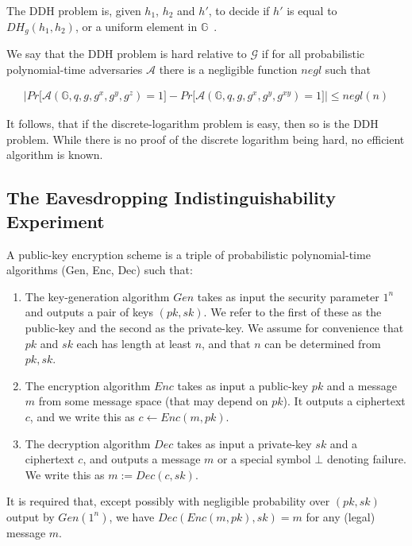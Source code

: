 The DDH problem is, given $h_1$, $h_2$ and $h'$, to decide if $h'$ is equal to $DH_g(h_1, h_2)$, or a uniform element in $\mathbb{G}$~\cite[page 321]{katz2014introduction}.
\begin{definition}
We say that the DDH problem is hard relative to $\mathcal{G}$ if for all probabilistic polynomial-time adversaries $\mathcal{A}$ there is a negligible function $negl$ such that
\vspace{-1em}
\begin{addmargin}[-0.5em]{-0.5em} 
{\setlength{\mathindent}{0cm}
\begin{align*}
\Big\lvert Pr\big[\mathcal{A}\left(\mathbb{G}, q, g, g^x, g^y, g^z \right) = 1\big] - Pr\big[ \mathcal{A}\left(\mathbb{G}, q, g, g^x, g^y, g^{xy}\right) =1  \big] \Big\rvert \leq negl(n)
\end{align*}}
\end{addmargin} 
\end{definition}

It follows, that if the discrete-logarithm problem is easy, then so is the DDH problem. While there is no proof of the discrete logarithm being hard, no efficient algorithm is known. %

\subsection{The Eavesdropping Indistinguishability Experiment}

\begin{definition}
A public-key encryption scheme is a triple of probabilistic polynomial-time algorithms (Gen, Enc, Dec) such that:
\begin{enumerate}

    \item The key-generation algorithm $Gen$ takes as input the security parameter $1^n$ and outputs a pair of keys $(pk,sk)$. We refer to the first of these as the public-key and the second as the private-key. We assume for convenience that $pk$ and $sk$ each has length at least $n$, and that $n$ can be determined from $pk,sk$.
    
    \item The encryption algorithm $Enc$ takes as input a public-key $pk$ and a message $m$ from some message space (that may depend on $pk$). It outputs a ciphertext $c$, and we write this as $c \leftarrow Enc(m,pk)$.
    
    \item The decryption algorithm $Dec$ takes as input a private-key $sk$ and a ciphertext $c$, and outputs a message $m$ or a special symbol $\bot$ denoting failure. We write this as $m := Dec(c, sk)$.
    
\end{enumerate}
It is required that, except possibly with negligible probability over $(pk,sk)$ output by $Gen(1^n)$, we have $Dec(Enc(m,pk),sk) = m$ for any (legal) message $m$.
\end{definition}

